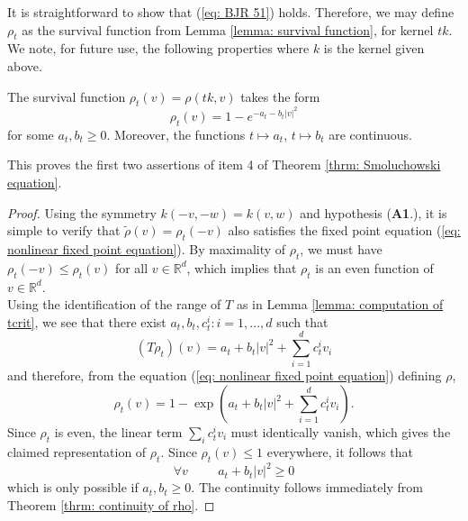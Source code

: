 It is straightforward to show that (\ref{eq: BJR 51}) holds. Therefore, we may define $\rho_t$ as the survival function from Lemma \ref{lemma: survival function}, for kernel $tk$. We note, for future use, the following properties where $k$ is the kernel given above.
\begin{lemma}\label{lemma: form of rho-t}
    The survival function $\rho_t(v)=\rho(tk,v)$ takes the form \begin{equation}
        \rho_t(v)=1-e^{-a_t-b_t|v|^2}
    \end{equation} for some $a_t, b_t \ge 0$. Moreover, the functions $t\mapsto a_t$, $t\mapsto b_t$ are continuous.
\end{lemma} This proves the first two assertions of item 4 of Theorem \ref{thrm: Smoluchowski equation}.
\begin{proof} Using the symmetry $k(-v,-w)=k(v,w)$ and hypothesis (\textbf{A1}.), it is simple to verify that $\tilde{\rho}(v)=\rho_t(-v)$ also satisfies the fixed point equation (\ref{eq: nonlinear fixed point equation}). By maximality of $\rho_t$, we must have $\rho_t(-v)\le \rho_t(v)$ for all $v\in \mathbb{R}^d$, which implies that $\rho_t$ is an even function of $v\in\mathbb{R}^d$. \medskip \\ Using the identification of the range of $T$ as in Lemma \ref{lemma: computation of tcrit}, we see that there exist $a_t, b_t, c^i_t: i=1, ..., d$ such that \begin{equation}
    (T\rho_t)(v)=a_t+b_t|v|^2+\sum_{i=1}^d c^i_t v_i
\end{equation}and therefore, from the equation (\ref{eq: nonlinear fixed point equation}) defining $\rho$, \begin{equation}
    \rho_t(v)=1-\exp\left(a_t+b_t|v|^2+\sum_{i=1}^d c^i_t v_i\right).
\end{equation} Since $\rho_t$ is even, the linear term $\sum_i c^i_t v_i$ must identically vanish, which gives the claimed representation of $\rho_t$. Since $\rho_t(v)\le 1$ everywhere, it follows that \begin{equation}
   \forall v \hspace{1cm} a_t+b_t|v|^2 \ge 0
\end{equation}which is only possible if $a_t, b_t\ge 0.$ The continuity follows immediately from Theorem \ref{thrm: continuity of rho}. \end{proof} 
